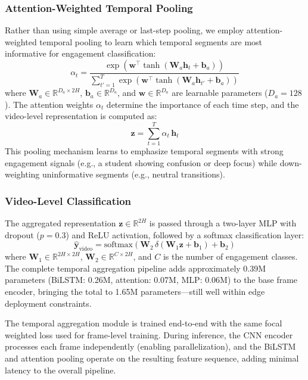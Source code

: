\documentclass[sensors,article,submit,pdftex,moreauthors]{Definitions/mdpi}
\begin{document}
\subsubsection{Attention-Weighted Temporal Pooling}

Rather than using simple average or last-step pooling, we employ attention-weighted temporal pooling to learn which temporal segments are most informative for engagement classification:
\begin{equation}
\alpha_t = \frac{\exp(\mathbf{w}^\top \tanh(\mathbf{W}_a \mathbf{h}_t + \mathbf{b}_a))}{\sum_{t'=1}^{T} \exp(\mathbf{w}^\top \tanh(\mathbf{W}_a \mathbf{h}_{t'} + \mathbf{b}_a))}
\end{equation}
where $\mathbf{W}_a \in \mathbb{R}^{D_a \times 2H}$, $\mathbf{b}_a \in \mathbb{R}^{D_a}$, and $\mathbf{w} \in \mathbb{R}^{D_a}$ are learnable parameters ($D_a = 128$). The attention weights $\alpha_t$ determine the importance of each time step, and the video-level representation is computed as:
\begin{equation}
\mathbf{z} = \sum_{t=1}^{T} \alpha_t \, \mathbf{h}_t
\end{equation}
This pooling mechanism learns to emphasize temporal segments with strong engagement signals (e.g., a student showing confusion or deep focus) while down-weighting uninformative segments (e.g., neutral transitions).

\subsubsection{Video-Level Classification}

The aggregated representation $\mathbf{z} \in \mathbb{R}^{2H}$ is passed through a two-layer MLP with dropout ($p=0.3$) and ReLU activation, followed by a softmax classification layer:
\begin{equation}
\hat{\mathbf{y}}_{\text{video}} = \text{softmax}(\mathbf{W}_2 \, \delta(\mathbf{W}_1 \mathbf{z} + \mathbf{b}_1) + \mathbf{b}_2)
\end{equation}
where $\mathbf{W}_1 \in \mathbb{R}^{2H \times 2H}$, $\mathbf{W}_2 \in \mathbb{R}^{C \times 2H}$, and $C$ is the number of engagement classes. The complete temporal aggregation pipeline adds approximately 0.39M parameters (BiLSTM: 0.26M, attention: 0.07M, MLP: 0.06M) to the base frame encoder, bringing the total to 1.65M parameters---still well within edge deployment constraints.

The temporal aggregation module is trained end-to-end with the same focal weighted loss used for frame-level training. During inference, the CNN encoder processes each frame independently (enabling parallelization), and the BiLSTM and attention pooling operate on the resulting feature sequence, adding minimal latency to the overall pipeline.
\end{document}
